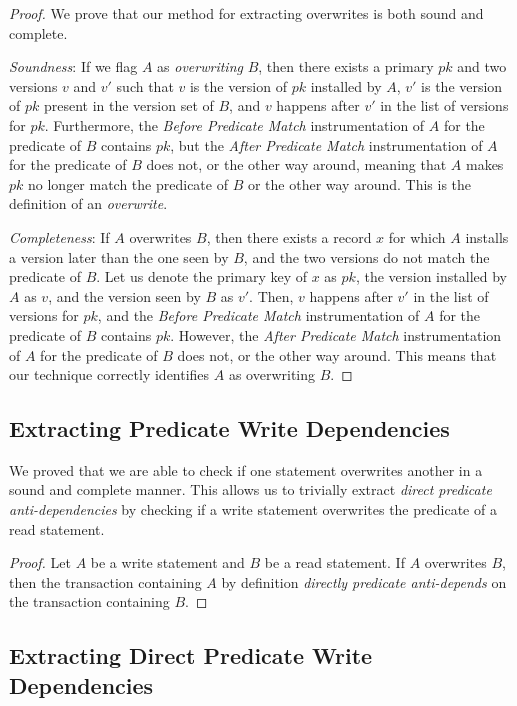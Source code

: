 \begin{proof}
We prove that our method for extracting overwrites is both sound and complete.

\textit{Soundness}: If we flag $A$ as \textit{overwriting} $B$, then there exists a primary $pk$ and two versions $v$ and $v'$ such that $v$ is the version of $pk$ installed by $A$, $v'$ is the version of $pk$ present in the version set of $B$, and $v$ happens after $v'$ in the list of versions for $pk$. Furthermore, the \textit{Before Predicate Match} instrumentation of $A$ for the predicate of $B$ contains $pk$, but the \textit{After Predicate Match} instrumentation of $A$ for the predicate of $B$ does not, or the other way around, meaning that $A$ makes $pk$ no longer match the predicate of $B$ or the other way around. This is the definition of an \textit{overwrite}.

\textit{Completeness}: If $A$ overwrites $B$, then there exists a record $x$ for which $A$ installs a version later than the one seen by $B$, and the two versions do not match the predicate of $B$. Let us denote the primary key of $x$ as $pk$, the version installed by $A$ as $v$, and the version seen by $B$ as $v'$. Then, $v$ happens after $v'$ in the list of versions for $pk$, and the \textit{Before Predicate Match} instrumentation of $A$ for the predicate of $B$ contains $pk$. However, the \textit{After Predicate Match} instrumentation of $A$ for the predicate of $B$ does not, or the other way around. This means that our technique correctly identifies $A$ as overwriting $B$.
\end{proof}

\subsection{Extracting Predicate Write Dependencies}

We proved that we are able to check if one statement overwrites another in a sound and complete manner. This allows us to trivially extract \textit{direct predicate anti-dependencies} by checking if a write statement overwrites the predicate of a read statement.

\begin{proof}
    Let $A$ be a write statement and $B$ be a read statement. If $A$ overwrites $B$, then the transaction containing $A$ by definition \textit{directly predicate anti-depends} on the transaction containing $B$.
\end{proof}

\subsection{Extracting Direct Predicate Write Dependencies}

